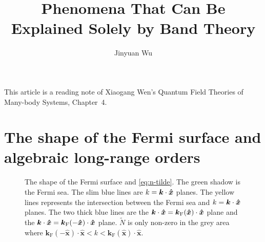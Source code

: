 \documentclass[hyperref, a4paper]{article}
\title{Phenomena That Can Be Explained Solely by Band Theory}
\author{Jinyuan Wu}
\begin{document}
\maketitle

This article is a reading note of Xiaogang Wen's Quantum Field Theories of Many-body Systems, Chapter~4.

\section{The shape of the Fermi surface and algebraic long-range orders}

\begin{figure}
    \centering
    
    \caption{The shape of the Fermi surface and \eqref{eq:n-tilde}. The green shadow is the Fermi sea. The slim blue lines are $k = \vb*{k} \cdot \vu*{x}$ planes. The yellow lines represents the intersection between the Fermi sea and $k = \vb*{k} \cdot \vu*{x}$ planes. The two thick blue lines are the $\vb*{k} \cdot \vu*{x} = \vb*{k}_\text{F}(\vu*{x}) \cdot \vu*{x}$ plane and the $\vb*{k} \cdot \vu*{x} = \vb*{k}_\text{F}(-\vu*{x}) \cdot \vu*{x}$ plane. $\tilde{N}$ is only non-zero in the grey area where $\boldsymbol{k}_{\text{F}}( -\hat{\boldsymbol{x}}) \cdot \hat{\boldsymbol{x}} < k< \boldsymbol{k}_{\text{F}}(\hat{\boldsymbol{x}}) \cdot \hat{\boldsymbol{x}}$.}
    \label{fig:n-tilde}
\end{figure}
\end{document}
